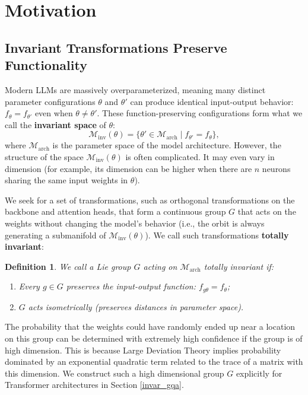 \documentclass{article} %
\newtheorem{defn}{Definition}
\begin{document}
\section{Motivation}


\subsection{Invariant Transformations Preserve Functionality}

Modern LLMs are massively overparameterized, meaning many distinct parameter configurations $\theta$ and $\theta'$ can produce identical input-output behavior: $f_\theta = f_{\theta'}$ even when $\theta \neq \theta'$. These function-preserving configurations form what we call the \textbf{invariant space} of $\theta$:
\[
\mathcal{M}_{\text{inv}}(\theta) = \{ \theta' \in \mathcal{M}_{\text{arch}} \mid f_{\theta'} = f_{\theta} \},
\]
where $\mathcal{M}_{\text{arch}}$ is the parameter space of the model architecture. 
However, the structure of the space $\mathcal{M}_{\text{inv}}(\theta)$ is often complicated. It may even vary in dimension (for example, its dimension can be higher when there are $n$ neurons sharing the same input weights in $\theta$).

We seek for a set of transformations, such as orthogonal transformations on the backbone and attention heads, that form a continuous group $G$ that acts on the weights without changing the model's behavior (i.e., the orbit is always generating a submanifold of $\mathcal{M}_{\text{inv}}(\theta)$). We call such transformations \textbf{totally invariant}:
\begin{defn}
We call a Lie group $G$ acting on $\mathcal{M}_{\text{arch}}$ \textit{totally invariant} if:
\begin{enumerate}
    \item Every $g \in G$ preserves the input-output function: $f_{g \theta} = f_\theta$;
    \item $G$ acts isometrically (preserves distances in parameter space).
\end{enumerate}
\end{defn}

The probability that the weights could have randomly ended up near a location on this group can be determined with extremely high confidence if the group is of high dimension. This is because Large Deviation Theory implies probability dominated by an exponential quadratic term related to the trace of a matrix with this dimension. We construct such a high dimensional group $G$ explicitly for Transformer architectures in Section \ref{invar_gqa}.
\end{document}
